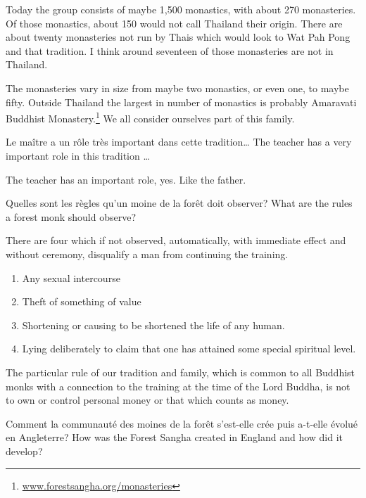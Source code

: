 Today the group consists of maybe 1,500 monastics, with about 270
monasteries. Of those monastics, about 150 would not call Thailand their
origin. There are about twenty monasteries not run by Thais which would
look to Wat Pah Pong and that tradition. I think around seventeen of
those monasteries are not in Thailand. 

The monasteries vary in size from maybe two monastics, or even one, to
maybe fifty. Outside Thailand the largest in number of monastics is
probably Amaravati Buddhist Monastery.\footnote{\href{http://forestsangha.org/monasteries}{www.forestsangha.org/monasteries}}
We all consider ourselves part of this family.

\questionBi%
{Le maître a un rôle très important dans cette tradition\ldots}%
{The teacher has a very important role in this tradition \ldots}

\answer{}
The teacher has an important role, yes. Like the father.

\questionBi%
{Quelles sont les règles qu'un moine de la forêt doit observer?}%
{What are the rules a forest monk should observe?}

\answer{}
There are four which if not observed, automatically, with immediate
effect and without ceremony, disqualify a man from continuing the
training.

\begin{enumerate}
  \item Any sexual intercourse
  \item Theft of something of value
  \item Shortening or causing to be shortened the life of any human.
  \item Lying deliberately to claim that one has attained some special spiritual level.
\end{enumerate}

The particular rule of our tradition and family, which is common to all
Buddhist monks with a connection to the training at the time of the Lord
Buddha, is not to own or control personal money or that which counts as
money.

\questionBi%
{Comment la communauté des moines de la forêt s'est-elle crée puis a-t-elle évolué en Angleterre?}%
{How was the Forest Sangha created in England and how did it develop?}

